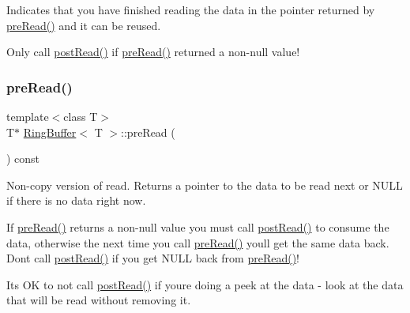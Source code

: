 Indicates that you have finished reading the data in the pointer returned by \mbox{\hyperlink{class_ring_buffer_a724ce39b381489539fda406e06596a1d}{pre\+Read()}} and it can be reused. 

Only call \mbox{\hyperlink{class_ring_buffer_aad9eebd3dc4cc774666467de89c6de86}{post\+Read()}} if \mbox{\hyperlink{class_ring_buffer_a724ce39b381489539fda406e06596a1d}{pre\+Read()}} returned a non-\/null value! \mbox{\label{class_ring_buffer_a724ce39b381489539fda406e06596a1d}} 
\subsubsection{\texorpdfstring{pre\+Read()}{preRead()}}
{\footnotesize\ttfamily template$<$class T$>$ \\
T$\ast$ \mbox{\hyperlink{class_ring_buffer}{Ring\+Buffer}}$<$ T $>$\+::pre\+Read (\begin{DoxyParamCaption}{ }\end{DoxyParamCaption}) const\hspace{0.3cm}{\ttfamily [inline]}}



Non-\/copy version of read. Returns a pointer to the data to be read next or N\+U\+LL if there is no data right now. 

If \mbox{\hyperlink{class_ring_buffer_a724ce39b381489539fda406e06596a1d}{pre\+Read()}} returns a non-\/null value you must call \mbox{\hyperlink{class_ring_buffer_aad9eebd3dc4cc774666467de89c6de86}{post\+Read()}} to consume the data, otherwise the next time you call \mbox{\hyperlink{class_ring_buffer_a724ce39b381489539fda406e06596a1d}{pre\+Read()}} you\textquotesingle{}ll get the same data back. Don\textquotesingle{}t call \mbox{\hyperlink{class_ring_buffer_aad9eebd3dc4cc774666467de89c6de86}{post\+Read()}} if you get N\+U\+LL back from \mbox{\hyperlink{class_ring_buffer_a724ce39b381489539fda406e06596a1d}{pre\+Read()}}!

It\textquotesingle{}s OK to not call \mbox{\hyperlink{class_ring_buffer_aad9eebd3dc4cc774666467de89c6de86}{post\+Read()}} if you\textquotesingle{}re doing a peek at the data -\/ look at the data that will be read without removing it. \mbox{\label{class_ring_buffer_a60177190baecb3c438f8392d6f9a35f7}} 
